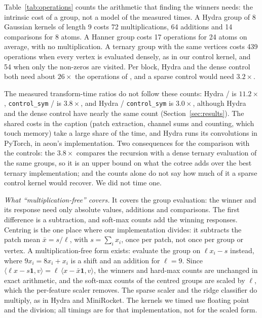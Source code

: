 Table~\ref{tab:operations} counts the arithmetic that finding the winners needs: the
intrinsic cost of a group, not a model of the measured times. A Hydra group of 8 Gaussian
kernels of length 9 costs 72 multiplications, 64 additions and 14 comparisons for 8 atoms.
A Hanner group costs 17 operations for 24 atoms on average, with no multiplication. A
ternary group with the same vertices costs 439 operations when every vertex is evaluated
densely, as in our control kernel, and 54 when only the non-zeros are visited. Per block,
Hydra and the dense control both need about $26\times$ the operations of \hh{}, and a
sparse control would need $3.2\times$.

The measured transform-time ratios do not follow these counts: Hydra / \hh{} is
$11.2\times$, \texttt{control\_sym} / \hh{} is $3.8\times$, and Hydra / \texttt{control\_sym}
is $3.0\times$, although Hydra and the dense control have nearly the same count
(Section~\ref{sec:results}). The shared costs in the caption (patch extraction, channel
sums and counting, which touch memory) take a large share of the time, and Hydra runs its
convolutions in PyTorch, in aeon's implementation. Two consequences for the comparison with
the controls: the $3.8\times$ compares the recursion with a dense ternary evaluation of the
same groups, so it is an upper bound on what the cotree adds over the best ternary
implementation; and the counts alone do not say how much of it a sparse control kernel would
recover. We did not time one.

\emph{What ``multiplication-free'' covers.} It covers the group evaluation: the winner and
its response need only absolute values, additions and comparisons. The first difference is
a subtraction, and soft-max counts add the winning responses. Centring is the one place
where our implementation divides: it subtracts the patch mean $\bar{x}=s/\ell$, with
$s=\sum_i x_i$, once per patch, not once per group or vertex. A multiplication-free form
exists: evaluate the group on $\ell x_i-s$ instead, where $9x_i=8x_i+x_i$ is a shift and an
addition for $\ell=9$. Since $\langle\ell x-s\mathbf{1},v\rangle=\ell\,\langle
x-\bar{x}\mathbf{1},v\rangle$, the winners and hard-max counts are unchanged in exact
arithmetic, and the soft-max counts of the centred groups are scaled by $\ell$, which the
per-feature scaler removes. The sparse scaler and the ridge classifier do multiply, as in
Hydra and MiniRocket. The kernels we timed use floating point and the division; all
timings are for that implementation, not for the scaled form.

